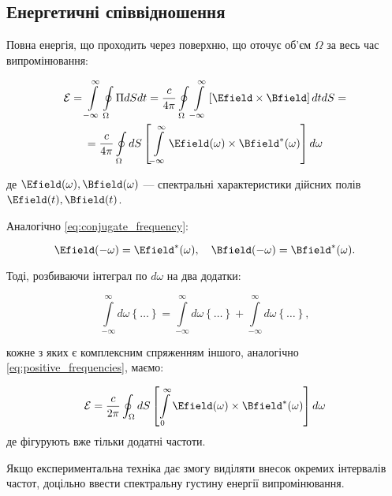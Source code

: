 \subsection*{Енергетичні співвідношення}

Повна енергія, що проходить через поверхню, що оточує об’єм \( \Omega \) за весь час випромінювання:

\begin{multline*}
\mathcal{E} = \int\limits_{-\infty}^{\infty} \oint\limits_{\Omega} \Pi dS dt = \frac{c}{4\pi} \oint\limits_{\Omega} \int\limits_{-\infty}^{\infty}
\left[ \Efield \times \Bfield \right] dtdS = \\
= \frac{c}{4\pi} \oint\limits_{\Omega} dS \left[ \int\limits_{-\infty}^{\infty} \Efield(\omega) \times \Bfield^{*}(\omega) \right] d\omega
\end{multline*}

де \( \Efield(\omega), \Bfield(\omega) \) --- спектральні характеристики дійсних полів \( \Efield(t), \Bfield(t) \).

Аналогічно \eqref{eq:conjugate_frequency}:

\begin{equation*}
\Efield(-\omega) = \Efield^{*}(\omega), \quad \Bfield(-\omega) = \Bfield^{*}(\omega).
\end{equation*}

Тоді, розбиваючи інтеграл по \( d\omega \) на два додатки:

\begin{equation*}
\int\limits_{-\infty}^{\infty} d\omega \left\{ \ldots \right\} = \int\limits_{-\infty}^{\infty} d\omega \left\{ \ldots \right\} +
\int\limits_{-\infty}^{\infty}
d\omega
\left\{ \ldots \right\},
\end{equation*}

кожне з яких є комплексним спряженням іншого, аналогічно \eqref{eq:positive_frequencies}, маємо:

\begin{equation}
\mathcal{E} = \frac{c}{2\pi} \oint_{\Omega} dS \left[ \int\limits_{0}^{\infty} \Efield(\omega) \times \Bfield^{*}(\omega) \right] d\omega
\label{eq:energy_positive_frequencies}
\end{equation}
де фігурують вже тільки додатні частоти.

Якщо експериментальна техніка дає змогу виділяти внесок окремих інтервалів частот, доцільно ввести спектральну густину енергії випромінювання.

